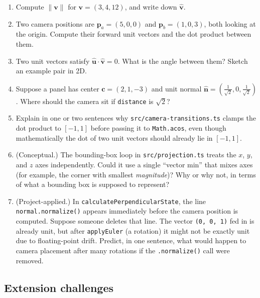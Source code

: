 \documentclass{article}
\begin{document}
\begin{enumerate}
  \item Compute $\|\mathbf{v}\|$ for $\mathbf{v} = (3, 4, 12)$, and write down $\hat{\mathbf{v}}$.

  \item Two camera positions are $\mathbf{p}_a = (5, 0, 0)$ and $\mathbf{p}_b = (1, 0, 3)$, both looking at the origin. Compute their forward unit vectors and the dot product between them.

  \item Two unit vectors satisfy $\hat{\mathbf{u}} \cdot \hat{\mathbf{v}} = 0$. What is the angle between them? Sketch an example pair in 2D.

  \item Suppose a panel has center $\mathbf{c} = (2, 1, -3)$ and unit normal $\hat{\mathbf{n}} = \left(\tfrac{1}{\sqrt{2}}, 0, \tfrac{1}{\sqrt{2}}\right)$. Where should the camera sit if \texttt{distance} is $\sqrt{2}$?

  \item Explain in one or two sentences why \texttt{src/camera-transitions.ts} clamps the dot product to $[-1, 1]$ before passing it to \texttt{Math.acos}, even though mathematically the dot of two unit vectors should already lie in $[-1, 1]$.

  \item (Conceptual.) The bounding-box loop in \texttt{src/projection.ts} treats the $x$, $y$, and $z$ axes independently. Could it use a single ``vector min'' that mixes axes (for example, the corner with smallest \emph{magnitude})? Why or why not, in terms of what a bounding box is supposed to represent?

  \item (Project-applied.) In \texttt{calculatePerpendicularState}, the line \texttt{normal.normalize()} appears immediately before the camera position is computed. Suppose someone deletes that line. The vector \texttt{(0, 0, 1)} fed in is already unit, but after \texttt{applyEuler} (a rotation) it might not be exactly unit due to floating-point drift. Predict, in one sentence, what would happen to camera placement after many rotations if the \texttt{.normalize()} call were removed.
\end{enumerate}

\subsection*{Extension challenges}
\end{document}

